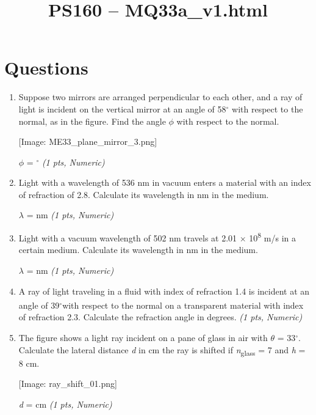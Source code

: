 \documentclass[11pt]{article}
\title{PS160 -- MQ33a\_v1.html}
\date{}
\begin{document}
\maketitle

\section*{Questions}

\begin{enumerate}[leftmargin=*]
  \item Suppose two mirrors are arranged perpendicular to each other, and a ray of light is incident on the vertical mirror at an angle of 58$^{\circ}$ with respect to the normal, as in the figure. Find the angle $\phi$ with respect to the normal.

[Image: ME33\_plane\_mirror\_3.png]

$\phi$ = $^{\circ}$ \hfill \textit{(1 pts, Numeric)}

  \item Light with a wavelength of 536 nm in vacuum enters a material with an index of refraction of 2.8. Calculate its wavelength in nm in the medium.

$\lambda$ = nm \hfill \textit{(1 pts, Numeric)}

  \item Light with a vacuum wavelength of 502 nm travels at 2.01 $\times$ 10\textsuperscript{8} m/s in a certain medium. Calculate its wavelength in nm in the medium.

$\lambda$ = nm \hfill \textit{(1 pts, Numeric)}

  \item A ray of light traveling in a fluid with index of refraction 1.4 is incident at an angle of 39$^{\circ}$\textsuperscript{}with respect to the normal on a transparent material with index of refraction 2.3. Calculate the refraction angle in degrees. \hfill \textit{(1 pts, Numeric)}

  \item The figure shows a light ray incident on a pane of glass in air with $\theta$ = 33$^{\circ}$. Calculate the lateral distance \emph{d} in cm the ray is shifted if \emph{n}\textsubscript{glass} = 7 and \emph{h} = 8 cm.

[Image: ray\_shift\_01.png]

\emph{d} = cm \hfill \textit{(1 pts, Numeric)}

\end{enumerate}
\end{document}
